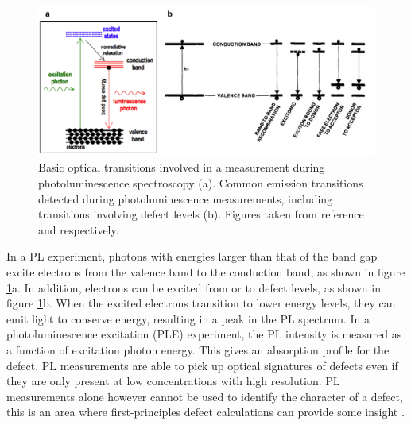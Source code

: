\documentclass[11pt, twoside]{report}
\begin{document}
\begin{figure}[h!]
  \centering
    \includegraphics[width=1.0\textwidth]{figures/PL_transitions.png}
    \caption[Basic optical transitions involved in a measurement during photoluminescence spectroscopy (a). Common emission transitions detected during photoluminescence measurements, including transitions involving defect levels (b).]{Basic optical transitions involved in a measurement during photoluminescence spectroscopy (a). Common emission transitions detected during photoluminescence measurements, including transitions involving defect levels (b). Figures taken from reference  and  respectively.}
  \label{PL_transitions}
\end{figure}


In a PL experiment, photons with energies larger than that of the band gap excite electrons from the valence band to the conduction band, as shown in figure \ref{PL_transitions}a. In addition, electrons can be excited from or to defect levels, as shown in figure \ref{PL_transitions}b. When the excited electrons transition to lower energy levels, they can emit light to conserve energy, resulting in a peak in the PL spectrum. In a photoluminescence excitation (PLE) experiment, the PL intensity is measured as a function of excitation photon energy. This gives an absorption profile for the defect. PL measurements are able to pick up optical signatures of defects even if they are only present at low concentrations with high resolution. PL measurements alone however cannot be used to identify the character of a defect, this is an area where first-principles defect calculations can provide some insight \cite{defects_tutorial}. 
\end{document}
